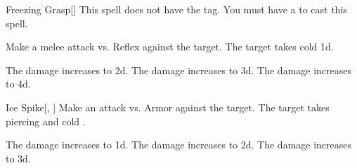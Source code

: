 \lowercase{\hypertarget{spell:Freezing Grasp}{}}\label{spell:Freezing Grasp}
\begin{freeability}[Rank 1]{\hypertarget{spell:Freezing Grasp}{Freezing Grasp}}[]
This spell does not have the  tag.
You must have a  to cast this spell.

Make a melee attack vs. Reflex against the target.
\hit The target takes cold  \plus1d.

\rankline
{} The damage increases to  \plus2d.
 The damage increases to  \plus3d.
 The damage increases to  \plus4d.
\end{freeability}
\vspace{0.25em}



\lowercase{\hypertarget{spell:Ice Spike}{}}\label{spell:Ice Spike}
\begin{freeability}[Rank 1]{\hypertarget{spell:Ice Spike}{Ice Spike}}[, ]
Make an attack vs. Armor against the target.
\hit The target takes piercing and cold .

\rankline
{} The damage increases to  \plus1d.
 The damage increases to  \plus2d.
 The damage increases to  \plus3d.
\end{freeability}
\vspace{0.25em}



